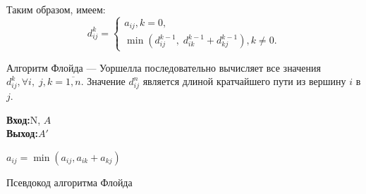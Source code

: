 \documentclass[a4paper,12pt]{report}
\renewcommand{\algorithmicrequire}{\textbf{Вход:}}
\renewcommand{\algorithmicensure}{\textbf{Выход:}}
\begin{document}
	\par Таким образом, имеем:
	$$d_{i j}^k = \begin{cases}
		a_{ij}, k =0,\\
		\min (d_{i j}^{k-1},\; d_{i k}^{k-1} + d_{k j}^{k-1}), k\ne 0.
		\end{cases}
$$

Алгоритм Флойда --- Уоршелла последовательно вычисляет все значения $d_{i j}^{k}, \forall i,\; j, k = \overline{1,n}$. Значение $d_{ij}^n$ является длиной кратчайшего пути из вершину $i$ в $j$. 
\begin{algorithm}[H]
	\algorithmicrequire{N, $A$}\\
 	\algorithmicensure{$A'$}
	\begin{algorithmic}[1]
					\STATE $a_{ij} = \min(a_{ij}, a_{ik} + a_{kj})$
				\ENDFOR
			\ENDFOR
		\ENDFOR
	\end{algorithmic}
	\caption{Псевдокод алгоритма Флойда}
	\label{alg:seq}
\end{algorithm}
\end{document}
